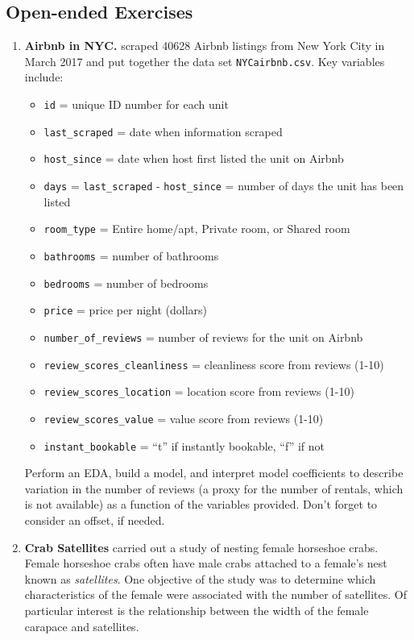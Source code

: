 \documentclass[
]{krantz}
\providecommand{\tightlist}{%
  \setlength{\itemsep}{0pt}\setlength{\parskip}{0pt}}
\begin{document}
\hypertarget{open-ended-exercises}{%
\subsection{Open-ended Exercises}\label{open-ended-exercises}}

\begin{enumerate}
\def\labelenumi{\arabic{enumi}.}
\item
  \textbf{Airbnb in NYC.} \citet{Awad2017} scraped 40628 Airbnb listings from New York City in March 2017 and put together the data set \texttt{NYCairbnb.csv}. Key variables include:

  \begin{itemize}
  \tightlist
  \item
    \texttt{id} = unique ID number for each unit
  \item
    \texttt{last\_scraped} = date when information scraped
  \item
    \texttt{host\_since} = date when host first listed the unit on Airbnb
  \item
    \texttt{days} = \texttt{last\_scraped} - \texttt{host\_since} = number of days the unit has been listed
  \item
    \texttt{room\_type} = Entire home/apt, Private room, or Shared room
  \item
    \texttt{bathrooms} = number of bathrooms
  \item
    \texttt{bedrooms} = number of bedrooms
  \item
    \texttt{price} = price per night (dollars)
  \item
    \texttt{number\_of\_reviews} = number of reviews for the unit on Airbnb
  \item
    \texttt{review\_scores\_cleanliness} = cleanliness score from reviews (1-10)
  \item
    \texttt{review\_scores\_location} = location score from reviews (1-10)
  \item
    \texttt{review\_scores\_value} = value score from reviews (1-10)
  \item
    \texttt{instant\_bookable} = ``t'' if instantly bookable, ``f'' if not
  \end{itemize}

  Perform an EDA, build a model, and interpret model coefficients to describe variation in the number of reviews (a proxy for the number of rentals, which is not available) as a function of the variables provided. Don't forget to consider an offset, if needed.
\item
  \textbf{Crab Satellites} \citet{Brockmann1996} carried out a study of nesting female horseshoe crabs. Female horseshoe crabs often have male crabs attached to a female's nest known as \emph{satellites}. One objective of the study was to determine which characteristics of the female were associated with the number of satellites. Of particular interest is the relationship between the width of the female carapace and satellites.


\end{enumerate}
\end{document}
